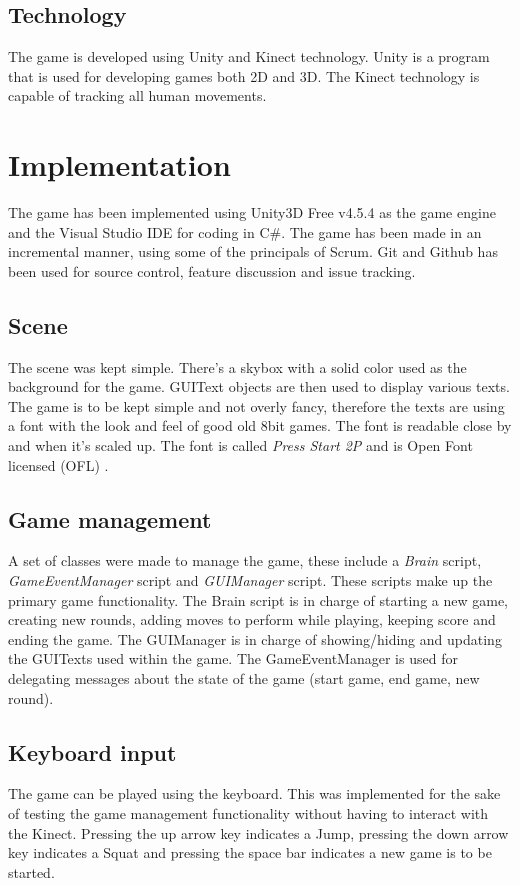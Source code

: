 \documentclass[11pt]{report}
\begin{document}
\section{Technology}
The game is developed using Unity and Kinect technology. Unity is a program that is used for developing games both 2D and 3D. The Kinect technology is capable of tracking all human movements.


\chapter{Implementation}
The game has been implemented using Unity3D Free v4.5.4 as the game engine and the Visual Studio IDE for coding in C\#.  The game has been made in an incremental manner, using some of the principals of Scrum. Git and Github has been used for source control, feature discussion and issue tracking. 

\section{Scene}
The scene was kept simple. There's a skybox with a solid color used as the background for the game. GUIText objects are then used to display various texts. The game is to be kept simple and not overly fancy, therefore the texts are using a font with the look and feel of good old 8bit games. The font is readable close by and when it's scaled up. The font is called \emph{Press Start 2P} and is Open Font licensed (OFL) \cite{2pfont}. 

\section{Game management}
A set of classes were made to manage the game, these include a \emph{Brain} script, \emph{GameEventManager} script and \emph{GUIManager} script. These scripts make up the primary game functionality. The Brain script is in charge of starting a new game, creating new rounds, adding moves to perform while playing, keeping score and ending the game. The GUIManager is in charge of showing/hiding and updating the GUITexts used within the game. The GameEventManager is used for delegating messages about the state of the game (start game, end game, new round).

\section{Keyboard input}
The game can be played using the keyboard. This was implemented for the sake of testing the game management functionality without having to interact with the Kinect. Pressing the up arrow key indicates a Jump, pressing the down arrow key indicates a Squat and pressing the space bar indicates a new game is to be started.
\end{document}
